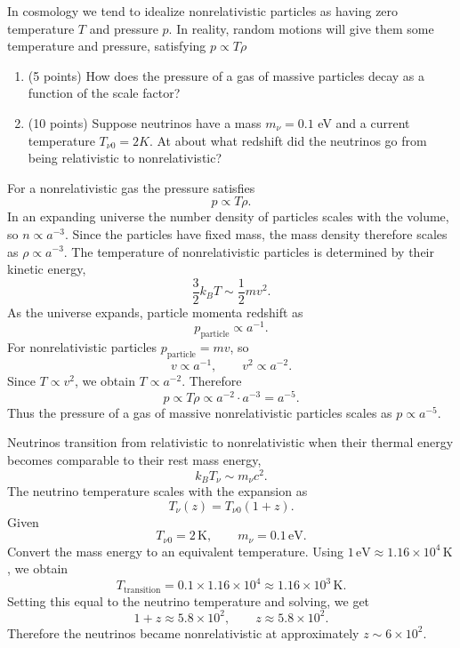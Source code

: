 \begin{problem}[3]
  In cosmology we tend to idealize nonrelativistic particles as having zero temperature $T$ and pressure $p$. In reality, random motions will give them some temperature and pressure, satisfying $p \propto T\rho$
  \begin{enumerate}
    \item (5 points) How does the pressure of a gas of massive particles decay as a function of the scale factor?
    \item (10 points) Suppose neutrinos have a mass $m_\nu = 0.1$ eV and a current temperature $T_{\nu 0} = 2K$. At about what redshift did the neutrinos go from being relativistic to nonrelativistic?
  \end{enumerate}
\end{problem}

\begin{solution}[(i)]
  For a nonrelativistic gas the pressure satisfies
  \[%
    p \propto T\rho
  .\]%
  In an expanding universe the number density of particles scales with the volume, so $n \propto a^{-3}$. Since the particles have fixed mass, the mass density therefore scales as $\rho \propto a^{-3}$. The temperature of nonrelativistic particles is determined by their kinetic energy,
  \[%
    \frac{3}{2}k_B T \sim \frac{1}{2}mv^2
  .\]%
  As the universe expands, particle momenta redshift as
  \[%
    p_{\text{particle}} \propto a^{-1}
  .\]%
  For nonrelativistic particles $p_{\text{particle}} = mv$, so
  \[%
    v \propto a^{-1}, \qquad v^2 \propto a^{-2}
  .\]%
  Since $T \propto v^2$, we obtain $T \propto a^{-2}$. Therefore
  \[%
    p \propto T\rho \propto a^{-2} \cdot a^{-3} = a^{-5}
  .\]%
  Thus the pressure of a gas of massive nonrelativistic particles scales as $p \propto a^{-5}$.
\end{solution}

\begin{solution}[(ii)]
  Neutrinos transition from relativistic to nonrelativistic when their thermal energy becomes comparable to their rest mass energy,
  \[%
    k_B T_\nu \sim m_\nu c^2
  .\]%
  The neutrino temperature scales with the expansion as
  \[%
    T_\nu(z) = T_{\nu 0}(1+z)
  .\]%
  Given
  \[%
    T_{\nu 0} = 2\,\text{K}, \qquad m_\nu = 0.1\,\text{eV}
  .\]%
  Convert the mass energy to an equivalent temperature. Using $1\,\text{eV} \approx 1.16\times 10^4\,\text{K}$, we obtain
  \[%
    T_{\text{transition}} = 0.1 \times 1.16\times 10^4 \approx 1.16\times 10^3 \,\text{K}
  .\]%
  Setting this equal to the neutrino temperature and solving, we get
  \[%
    1+z \approx 5.8\times 10^2, \qquad z \approx 5.8\times 10^2
  .\]%
  Therefore the neutrinos became nonrelativistic at approximately $z \sim 6\times10^2$.
\end{solution}
